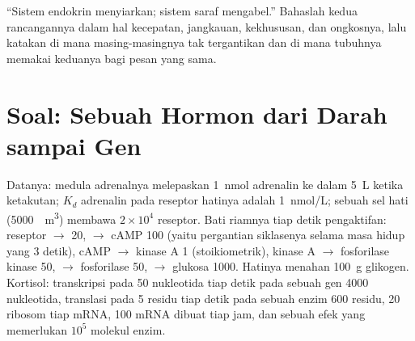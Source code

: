 \begin{exercise}[$\star\star\star$]\label{exo:b2:cell-signalling:12}
``Sistem endokrin menyiarkan; sistem saraf mengabel.'' Bahaslah kedua
rancangannya dalam hal kecepatan, jangkauan, kekhususan, dan ongkosnya,
lalu katakan di mana masing-masingnya tak tergantikan dan di mana
tubuhnya memakai keduanya bagi pesan yang sama.
\end{exercise}

\section{Soal: Sebuah Hormon dari Darah sampai Gen}

\begin{problem}
\label{pb:b2:cell-signalling:1}
Datanya: medula adrenalnya melepaskan \qty{1}{nmol} adrenalin ke dalam
\qty{5}{L}  ketika ketakutan; $K_d$ adrenalin pada reseptor
hatinya adalah \qty{1}{nmol/L}; sebuah sel hati (\qty{5000}{\micro
m^3}) membawa $2\times 10^{4}$ reseptor. Bati riamnya tiap detik
pengaktifan: reseptor $\to$  20,  $\to$ cAMP 100
(yaitu pergantian siklasenya selama masa hidup  yang 3 detik),
cAMP $\to$ kinase A 1 (stoikiometrik), kinase A $\to$ fosforilase
kinase 50, $\to$ fosforilase 50, $\to$ glukosa 1000. Hatinya menahan
\qty{100}{g} glikogen. Kortisol: transkripsi pada \qty{50}{} nukleotida
tiap detik pada sebuah gen \qty{4000}{} nukleotida, translasi pada
\qty{5}{} residu tiap detik pada sebuah enzim \num{600} residu, \num{20}
ribosom tiap mRNA, \num{100} mRNA dibuat tiap jam, dan sebuah efek yang
memerlukan $10^{5}$ molekul enzim.


\end{problem}
